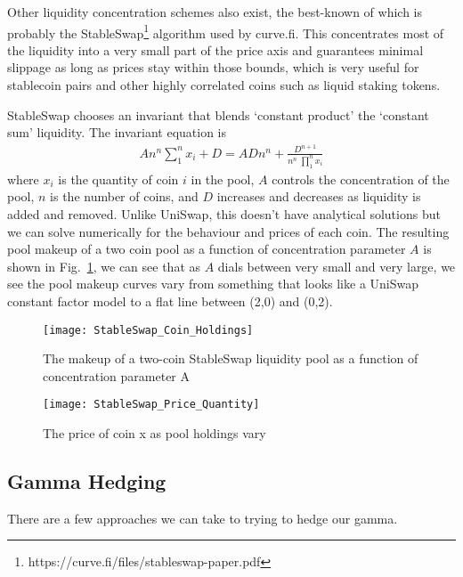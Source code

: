 \documentclass{article}
\begin{document}
Other liquidity concentration schemes also exist, the best-known of which is probably the StableSwap\footnote{https://curve.fi/files/stableswap-paper.pdf} algorithm used by curve.fi. This concentrates most of the liquidity into a very small part of the price axis and guarantees minimal slippage as long as prices stay within those bounds, which is very useful for stablecoin pairs and other highly correlated coins such as liquid staking tokens.

StableSwap chooses an invariant that blends `constant product' the `constant sum' liquidity. The invariant equation is
\begin{align}
A n^n \sum^n_1 x_i + D = A D n^n + {\frac {D^{n+1}} {n^n \; \prod^n_1 x_i}}
\label{eqn:stableswap}
\end{align}
where $x_i$ is the quantity of coin $i$ in the pool, $A$ controls the concentration of the pool, $n$ is the number of coins, and $D$ increases and decreases as liquidity is added and removed. Unlike UniSwap, this doesn't have analytical solutions but we can solve numerically for the behaviour and prices of each coin. The resulting pool makeup of a two coin pool as a function of concentration parameter $A$ is shown in Fig.~\ref{fig:stableswap}, we can see that as $A$ dials between very small and very large, we see the pool makeup curves vary from something that looks like a UniSwap constant factor model to a flat line between (2,0) and (0,2).

\begin{figure}
\centering
\texttt{[image: StableSwap\_Coin\_Holdings]}
\caption{The makeup of a two-coin StableSwap liquidity pool as a function of concentration parameter A}
\label{fig:stableswap}
\end{figure}

\begin{figure}
\centering
\texttt{[image: StableSwap\_Price\_Quantity]}
\caption{The price of coin x as pool holdings vary}
\label{fig:stableswap_price}
\end{figure}


\subsection*{Gamma Hedging}

There are a few approaches we can take to trying to hedge our gamma.
\end{document}
